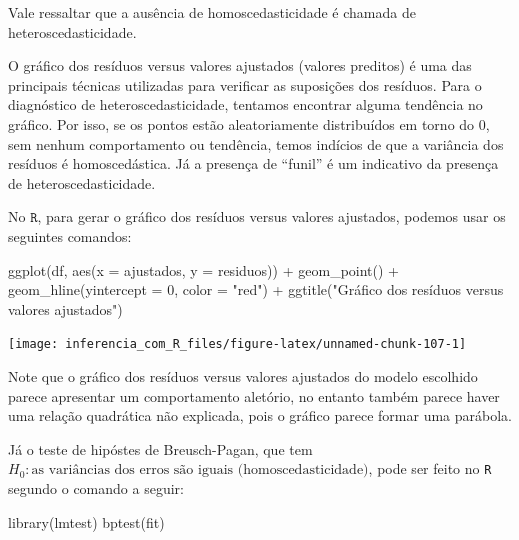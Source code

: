 \documentclass[
]{book}
\newenvironment{Shaded}{\begin{snugshade}}{\end{snugshade}}
\newcommand{\AttributeTok}[1]{\textcolor[rgb]{0.77,0.63,0.00}{#1}}
\newcommand{\DecValTok}[1]{\textcolor[rgb]{0.00,0.00,0.81}{#1}}
\newcommand{\FunctionTok}[1]{\textcolor[rgb]{0.00,0.00,0.00}{#1}}
\newcommand{\NormalTok}[1]{#1}
\newcommand{\SpecialCharTok}[1]{\textcolor[rgb]{0.00,0.00,0.00}{#1}}
\newcommand{\StringTok}[1]{\textcolor[rgb]{0.31,0.60,0.02}{#1}}
\begin{document}
Vale ressaltar que a ausência de homoscedasticidade é chamada de heteroscedasticidade.

O gráfico dos resíduos versus valores ajustados (valores preditos) é uma das principais técnicas utilizadas para verificar as suposições dos resíduos. Para o diagnóstico de heteroscedasticidade, tentamos encontrar alguma tendência no gráfico. Por isso, se os pontos estão aleatoriamente distribuídos em torno do 0, sem nenhum comportamento ou tendência, temos indícios de que a variância dos resíduos é homoscedástica. Já a presença de ``funil'' é um indicativo da presença de heteroscedasticidade.

No \(\texttt{R}\), para gerar o gráfico dos resíduos versus valores ajustados, podemos usar os seguintes comandos:

\begin{Shaded}
\begin{Highlighting}[]
\FunctionTok{ggplot}\NormalTok{(df, }\FunctionTok{aes}\NormalTok{(}\AttributeTok{x =}\NormalTok{ ajustados, }\AttributeTok{y =}\NormalTok{ residuos)) }\SpecialCharTok{+}
  \FunctionTok{geom\_point}\NormalTok{() }\SpecialCharTok{+}
  \FunctionTok{geom\_hline}\NormalTok{(}\AttributeTok{yintercept =} \DecValTok{0}\NormalTok{, }\AttributeTok{color =} \StringTok{"red"}\NormalTok{) }\SpecialCharTok{+}
  \FunctionTok{ggtitle}\NormalTok{(}\StringTok{"Gráfico dos resíduos versus valores ajustados"}\NormalTok{)}
\end{Highlighting}
\end{Shaded}

\begin{center}\texttt{[image: inferencia\_com\_R\_files/figure-latex/unnamed-chunk-107-1]} \end{center}

Note que o gráfico dos resíduos versus valores ajustados do modelo escolhido parece apresentar um comportamento aletório, no entanto também parece haver uma relação quadrática não explicada, pois o gráfico parece formar uma parábola.

Já o teste de hipóstes de Breusch-Pagan, que tem \(H_0:\text{as variâncias dos erros são iguais (homoscedasticidade)}\), pode ser feito no \texttt{R} segundo o comando a seguir:

\begin{Shaded}
\begin{Highlighting}[]
\FunctionTok{library}\NormalTok{(lmtest)}
\FunctionTok{bptest}\NormalTok{(fit)}
\end{Highlighting}
\end{Shaded}
\end{document}
